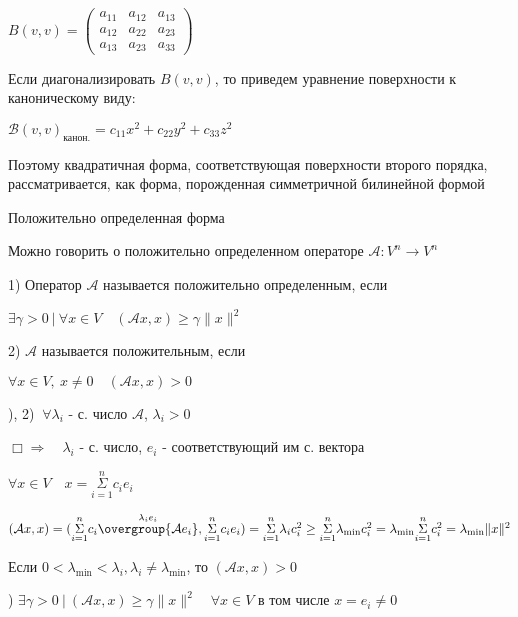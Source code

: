 \documentclass[12pt]{article}
\begin{document}
    $B(v, v) = \begin{pmatrix}a_{11} & a_{12} & a_{13} \\ a_{12} & a_{22} & a_{23} \\ a_{13} & a_{23} & a_{33}\end{pmatrix}$

    Если диагонализировать $B(v, v)$, то приведем уравнение поверхности к каноническому виду:

    $\mathcal{B}(v, v)_{\text{канон.}} = c_{11}x^2 + c_{22}y^2 + c_{33}z^2$

    Поэтому квадратичная форма, соответствующая поверхности второго порядка, рассматривается, как форма, порожденная симметричной билинейной формой

    \hypertarget{positivedefinedoperator}{}

    \Def Положительно определенная форма

    \Nota Можно говорить о положительно определенном операторе $\mathcal{A}: V^n \rightarrow V^n$

    1) Оператор $\mathcal{A}$ называется положительно определенным, если

    $\exists \gamma > 0 \ | \ \forall x \in V \quad (\mathcal{A}x, x) \geq \gamma \|x\|^2$

    2) $\mathcal{A}$ называется положительным, если

    $\forall x \in V, \ x \neq 0 \quad (\mathcal{A}x, x) > 0$

    ), 2) \Longleftrightarrow $\ \forall \lambda_i$ - с. число $\mathcal{A}$, $\lambda_i > 0$

    $\Box \Longrightarrow \quad \lambda_i$ - с. число, $e_i$ - соответствующий им с. вектора

    $\forall x \in V \quad x = \overset{n}{\underset{i = 1}{\Sigma}} c_i e_i$

    $(\mathcal{A}x, x) = (\overset{n}{\underset{i = 1}{\Sigma}} c_i \overset{\lambda_i e_i}{\overgroup{\mathcal{A}e_i}}, \overset{n}{\underset{i = 1}{\Sigma}} c_i e_i) =
    \overset{n}{\underset{i = 1}{\Sigma}} \lambda_i c_i^2 \geq \overset{n}{\underset{i = 1}{\Sigma}}\lambda_{\min} c_i^2 =
    \lambda_{\min} \overset{n}{\underset{i = 1}{\Sigma}}c_i^2 = \lambda_{\min} \|x\|^2$

    Если $0 < \lambda_{\min} < \lambda_i, \lambda_i \neq \lambda_{\min}$, то $(\mathcal{A}x, x) > 0$

    \Longleftarrow {}) \Longleftrightarrow $\exists \gamma > 0 \ | \ (\mathcal{A}x, x) \geq \gamma \|x\|^2 \quad \forall x \in V$ в том числе $x = e_i \neq 0$
\end{document}
